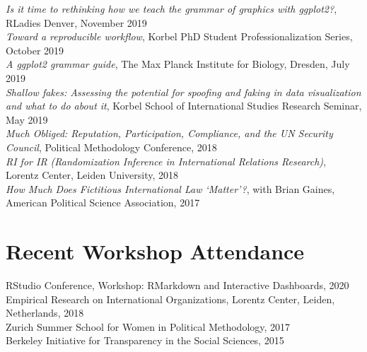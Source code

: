 \documentclass[margin, 10pt]{CVStyleTemplate}\usepackage[]{graphicx}\usepackage[]{color}
\begin{document}
\begin{resume}
%
\emph{Is it time to rethinking how we teach the grammar of graphics with ggplot2?}, RLadies Denver, November 2019\\[6pt]
%
\emph{Toward a reproducible workflow},  Korbel PhD Student Professionalization Series, October 2019 \\[6pt]
%
\emph{A ggplot2 grammar guide}, The Max Planck Institute for Biology, Dresden, July 2019 \\[6pt]
%
\emph{Shallow fakes: Assessing the potential for spoofing and faking in data visualization and what to do about it}, Korbel School of International Studies Research Seminar, May 2019 \\[6pt]
%
\emph{Much Obliged: Reputation, Participation, Compliance, and the UN Security Council}, Political Methodology Conference, 2018 \\[6pt]
%
\emph{RI for IR (Randomization Inference in International Relations Research)}, Lorentz Center, Leiden University, 2018\\[6pt] %
%
\emph{How Much Does Fictitious International Law `Matter'?}, with Brian Gaines, American Political Science Association, 2017 \\[6pt]%


\section{Recent Workshop Attendance}

RStudio Conference, Workshop: RMarkdown and Interactive Dashboards, 2020 \\[6pt]
Empirical Research on International Organizations, Lorentz Center, Leiden, Netherlands, 2018 \\[6pt]
Zurich Summer School for Women in Political Methodology, 2017\\[6pt]
Berkeley Initiative for Transparency in the Social Sciences, 2015\\[6pt]%


\end{resume}
\end{document}
